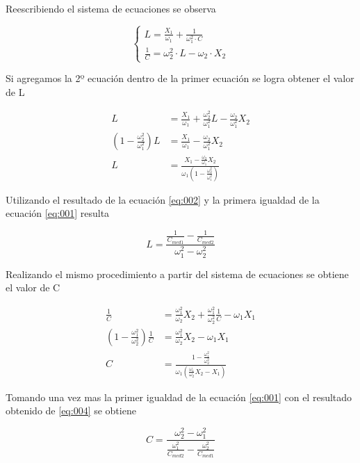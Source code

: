 \documentclass[a4paper,10pt]{article}
\begin{document}
		\indent Reescribiendo el sistema de ecuaciones se observa
		
		\[
		\begin{cases} 
			L = \frac{X_1}{\omega_1} + \frac{1}{\omega_1^2\cdot C} \\ 
			\frac{1}{C} = \omega_2^2\cdot L - \omega_2\cdot X_2
		\end{cases}
		\]
		
		\indent Si agregamos la 2º ecuación dentro de la primer ecuación 
		se logra obtener el valor de L

		\begin{align}\label{eq:002}
			L &= \frac{X_1}{\omega_1} + \frac{\omega_2^2}{\omega_1^2}L 
				- \frac{\omega_2}{\omega_1^2}X_2 \nonumber \\ 
			(1 - \frac{\omega_2^2}{\omega_1^2})L &= \frac{X_1}{\omega_1}
				- \frac{\omega_2}{\omega_1^2}X_2 \nonumber \\
			L &= \frac{X_1 - \frac{\omega_2}{\omega_1}X_2}
				{\omega_1(1 - \frac{\omega_2^2}{\omega_1^2})}
		\end{align}

		\indent Utilizando el resultado de la ecuación \ref{eq:002} y la primera
		igualdad de la ecuación \ref{eq:001} resulta

		\begin{equation}\label{eq:003}
			L = \frac{\frac{1}{C_{med1}} - \frac{1}{C_{med2}}}
					{\omega_1^2 - \omega_2^2}
		\end{equation}

		\indent Realizando el mismo procedimiento a partir del sistema de 
		ecuaciones se obtiene el valor de C

		\begin{align}\label{eq:004}
			\frac{1}{C} &= \frac{\omega_1^2}{\omega_2}X_2 + 
				\frac{\omega_1^2}{\omega_2^2}\frac{1}{C} - \omega_1X_1 \nonumber \\
			(1 - \frac{\omega_1^2}{\omega_2^2})\frac{1}{C} &= 
			\frac{\omega_1^2}{\omega_2}X_2 - \omega_1X_1 \nonumber \\
			C &= \frac{1 - \frac{\omega_1^2}{\omega_2^2}}
				{\omega_1(\frac{\omega_1}{\omega_2}X_2 - X_1)}
		\end{align}

		\indent Tomando una vez mas la primer igualdad de la ecuación 
		\ref{eq:001} con el resultado obtenido de \ref{eq:004} se obtiene

		\begin{equation}\label{eq:005}
			C = \frac{\omega_2^2 - \omega_1^2}
				{\frac{\omega_1^2}{C_{med2}} - \frac{\omega_2^2}{C_{med1}}}
		\end{equation}
\end{document}

